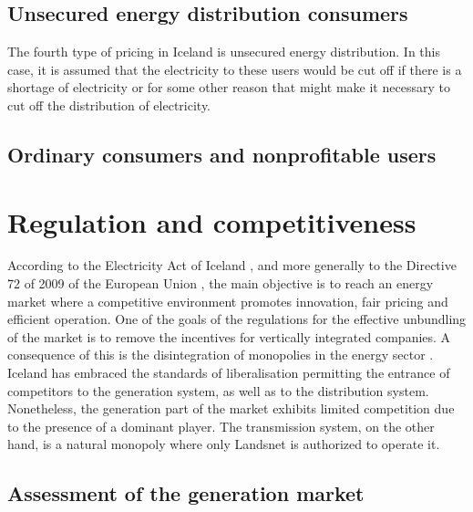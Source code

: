 \documentclass[svn, final]{rureport}
\begin{document}
\subsection{Unsecured energy distribution consumers}

The fourth type of pricing in Iceland is unsecured energy distribution. In this case, it is assumed that the electricity to these users would be cut off if there is a shortage of electricity or for some other reason that might make it necessary to cut off the distribution of electricity.

\subsection{Ordinary consumers and nonprofitable users}




\section{Regulation and competitiveness}

According to the Electricity Act of Iceland \cite{electricity_act_2003}, and more generally to the Directive 72 of 2009 of the European Union \cite{eu_parliament_2009}, the main objective is to reach an energy market where a competitive environment promotes innovation, fair pricing and efficient operation. One of the goals of the regulations for the effective unbundling of the market is to remove the incentives for vertically integrated companies. A consequence of this is the disintegration of monopolies in the energy sector \cite{eu_parliament_2009}. Iceland has embraced the standards of liberalisation permitting the entrance of competitors to the generation system, as well as to the distribution system. Nonetheless, the generation part of the market exhibits limited competition due to the presence of a dominant player. The transmission system, on the other hand, is a natural monopoly where only Landsnet is authorized to operate it.

\subsection{Assessment of the generation market}
\end{document}
